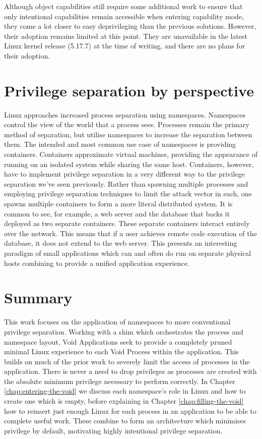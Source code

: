 \documentclass[12pt,a4paper,twoside]{report}
\begin{document}
Although object capabilities still require some additional work to ensure that only intentional capabilities remain accessible when entering capability mode, they come a lot closer to easy deprivileging than the previous solutions. However, their adoption remains limited at this point. They are unavailable in the latest Linux kernel release (5.17.7) at the time of writing, and there are no plans for their adoption.

\section{Privilege separation by perspective}

Linux approaches increased process separation using namespaces. Namespaces control the view of the world that a process sees. Processes remain the primary method of separation, but utilise namespaces to increase the separation between them. The intended and most common use case of namespaces is providing containers. Containers approximate virtual machines, providing the appearance of running on an isolated system while sharing the same host. Containers, however, have to implement privilege separation in a very different way to the privilege separation we've seen previously. Rather than spawning multiple processes and employing privilege separation techniques to limit the attack vector in each, one spawns multiple containers to form a more literal distributed system. It is common to see, for example, a web server and the database that backs it deployed as two separate containers. These separate containers interact entirely over the network. This means that if a user achieves remote code execution of the database, it does not extend to the web server. This presents an interesting paradigm of small applications which can and often do run on separate physical hosts combining to provide a unified application experience.

\section{Summary}

This work focuses on the application of namespaces to more conventional privilege separation. Working with a shim which orchestrates the process and namespace layout, Void Applications seek to provide a completely pruned minimal Linux experience to each Void Process within the application. This builds on much of the prior work to severely limit the access of processes in the application. There is never a need to drop privileges as processes are created with the absolute minimum privilege necessary to perform correctly. In Chapter \ref{chap:entering-the-void} we discuss each namespace's role in Linux and how to create one which is empty, before explaining in Chapter \ref{chap:filling-the-void} how to reinsert just enough Linux for each process in an application to be able to complete useful work. These combine to form an architecture which minimises privilege by default, motivating highly intentional privilege separation.
\end{document}
